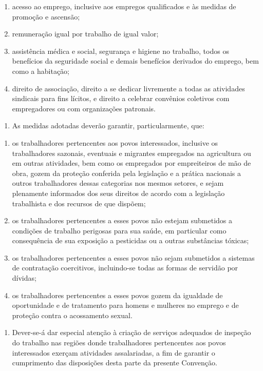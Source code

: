 \documentclass[
]{book}
\providecommand{\tightlist}{%
  \setlength{\itemsep}{0pt}\setlength{\parskip}{0pt}}
\begin{document}
\begin{enumerate}
\def\labelenumi{\alph{enumi})}
\item
  acesso ao emprego, inclusive aos empregos qualificados e às medidas de promoção e ascensão;
\item
  remuneração igual por trabalho de igual valor;
\item
  assistência médica e social, segurança e higiene no trabalho, todos os benefícios da seguridade social e demais benefícios derivados do emprego, bem como a habitação;
\item
  direito de associação, direito a se dedicar livremente a todas as atividades sindicais para fins lícitos, e direito a celebrar convênios coletivos com empregadores ou com organizações patronais.
\end{enumerate}

\begin{enumerate}
\def\labelenumi{\arabic{enumi}.}
\setcounter{enumi}{2}
\tightlist
\item
  As medidas adotadas deverão garantir, particularmente, que:
\end{enumerate}

\begin{enumerate}
\def\labelenumi{\alph{enumi})}
\item
  os trabalhadores pertencentes aos povos interessados, inclusive os trabalhadores sazonais, eventuais e migrantes empregados na agricultura ou em outras atividades, bem como os empregados por empreiteiros de mão de obra, gozem da proteção conferida pela legislação e a prática nacionais a outros trabalhadores dessas categorias nos mesmos setores, e sejam plenamente informados dos seus direitos de acordo com a legislação trabalhista e dos recursos de que dispõem;
\item
  os trabalhadores pertencentes a esses povos não estejam submetidos a condições de trabalho perigosas para sua saúde, em particular como consequência de sua exposição a pesticidas ou a outras substâncias tóxicas;
\item
  os trabalhadores pertencentes a esses povos não sejam submetidos a sistemas de contratação coercitivos, incluindo-se todas as formas de servidão por dívidas;
\item
  os trabalhadores pertencentes a esses povos gozem da igualdade de oportunidade e de tratamento para homens e mulheres no emprego e de proteção contra o acossamento sexual.
\end{enumerate}

\begin{enumerate}
\def\labelenumi{\arabic{enumi}.}
\setcounter{enumi}{3}
\tightlist
\item
  Dever-se-á dar especial atenção à criação de serviços adequados de inspeção do trabalho nas regiões donde trabalhadores pertencentes aos povos interessados exerçam atividades assalariadas, a fim de garantir o cumprimento das disposições desta parte da presente Convenção.
\end{enumerate}
\end{document}
